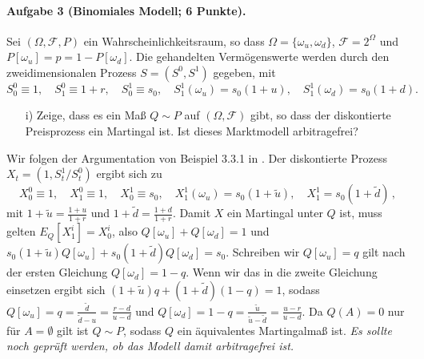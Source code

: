 \documentclass{article}
\begin{document}
\paragraph{Aufgabe 3 \textnormal{(Binomiales Modell; 6 Punkte)}.}
Sei $(\Omega,\mathscr{F},P)$ ein Wahr\-schein\-lich\-keits\-raum, so dass $\Omega=\{\omega_u,\omega_d\}$, $\mathscr{F}=2^\Omega$ und $P[\omega_u]=p=1-P[\omega_d]$.
Die gehandelten Vermögenswerte werden durch den zweidimensionalen Pro\-zess $S=(S^0,S^1)$ gegeben, mit
\begin{equation}
  \label{eq:a3s}
  S_0^0\equiv1,\quad S^0_1\equiv1+r,\quad S^1_0\equiv s_0,\quad S^1_1(\omega_u)=s_0(1+u),\quad S_1^1(\omega_d)=s_0(1+d).
\end{equation}
\begin{itemize}
\item [i)] Zeige, dass es ein Maß $Q\sim P$ auf $(\Omega,\mathscr{F})$ gibt, so dass der dis\-kon\-tier\-te Preisprozess ein Martingal ist.
  Ist dieses Marktmodell arbitragefrei?
\end{itemize}

Wir folgen der Argumentation von Beispiel 3.3.1 in \cite{Delbaen2006}.
Der dis\-kon\-tier\-te Prozess $X_t=(1,S^1_t/S^0_t)$ ergibt sich zu
\[
  X^0_0\equiv 1,\quad X^0_1\equiv 1,\quad X^1_0\equiv s_0,\quad X^1_1(\omega_u)=s_0(1+\tilde{u}),\quad X^1_1=s_0(1+\tilde{d})\,,
\]
mit $1+\tilde{u}=\frac{1+u}{1+r}$ und $1+\tilde{d}=\frac{1+d}{1+r}$.
Damit $X$ ein Martingal unter $Q$ ist, muss gelten $E_Q[X^i_1]=X^i_0$, also $Q[\omega_u]+Q[\omega_d]=1$ und $s_0(1+\tilde{u})Q[\omega_u]+s_0(1+\tilde{d})Q[\omega_d]=s_0$.
Schreiben wir $Q[\omega_u]=q$ gilt nach der ersten Gleichung $Q[\omega_d]=1-q$.
Wenn wir das in die zweite Gleichung einsetzen ergibt sich $(1+\tilde{u})q+(1+\tilde{d})(1-q)=1$, sodass $Q[\omega_u]=q=\frac{\tilde{d}}{\tilde{d}-u}=\frac{r-d}{u-d}$ und $Q[\omega_d]=1-q=\frac{\tilde{u}}{\tilde{u}-\tilde{d}}=\frac{u-r}{u-d}$.
Da $Q(A)=0$ nur für $A=\emptyset$ gilt ist $Q\sim P$, sodass $Q$ ein äquivalentes Martingalmaß ist.
\emph{Es sollte noch geprüft werden, ob das Modell damit arbitragefrei ist.}

\end{document}
